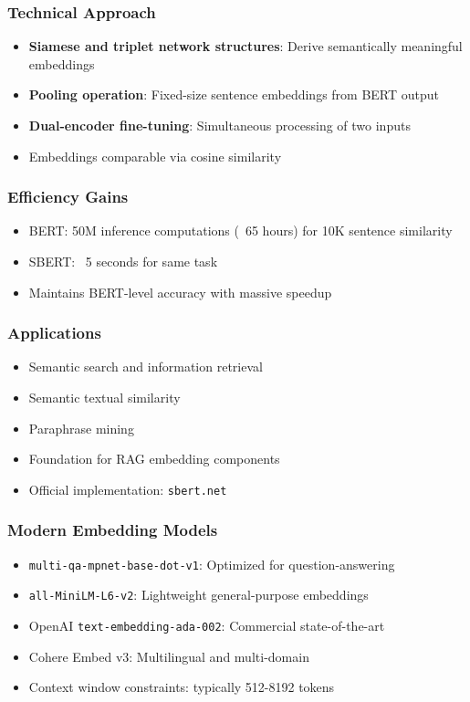 \documentclass[11pt,letterpaper]{article}
\begin{document}
\subsubsection{Technical Approach}
\begin{itemize}[leftmargin=*]
    \item \textbf{Siamese and triplet network structures}: Derive semantically meaningful embeddings
    \item \textbf{Pooling operation}: Fixed-size sentence embeddings from BERT output
    \item \textbf{Dual-encoder fine-tuning}: Simultaneous processing of two inputs
    \item Embeddings comparable via cosine similarity
\end{itemize}

\subsubsection{Efficiency Gains}
\begin{itemize}[leftmargin=*]
    \item BERT: 50M inference computations (~65 hours) for 10K sentence similarity
    \item SBERT: ~5 seconds for same task
    \item Maintains BERT-level accuracy with massive speedup
\end{itemize}

\subsubsection{Applications}
\begin{itemize}[leftmargin=*]
    \item Semantic search and information retrieval
    \item Semantic textual similarity
    \item Paraphrase mining
    \item Foundation for RAG embedding components
    \item Official implementation: \texttt{sbert.net}
\end{itemize}

\subsubsection{Modern Embedding Models}
\begin{itemize}[leftmargin=*]
    \item \texttt{multi-qa-mpnet-base-dot-v1}: Optimized for question-answering
    \item \texttt{all-MiniLM-L6-v2}: Lightweight general-purpose embeddings
    \item OpenAI \texttt{text-embedding-ada-002}: Commercial state-of-the-art
    \item Cohere Embed v3: Multilingual and multi-domain
    \item Context window constraints: typically 512-8192 tokens
\end{itemize}
\end{document}
